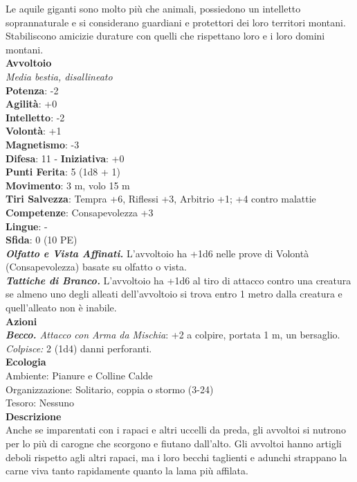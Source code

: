 \begin{multicols}{2}
Le aquile giganti sono molto più che animali, possiedono un intelletto soprannaturale e si considerano guardiani e protettori dei loro territori montani.\\

Stabiliscono amicizie durature con quelli che rispettano loro e i loro domini montani.\\

\medskip\textbf{Avvoltoio}\\
\emph{Media bestia, disallineato}\\
\textbf{Potenza}: -2\\
\textbf{Agilità}: +0\\
\textbf{Intelletto}: -2\\
\textbf{Volontà}: +1\\
\textbf{Magnetismo}: -3\\
\textbf{Difesa}: 11 - \textbf{Iniziativa}: +0\\
\textbf{Punti Ferita}: 5 (1d8 + 1)\\
\textbf{Movimento}: 3 m, volo 15 m\\
\textbf{Tiri Salvezza}: Tempra +6, Riflessi +3, Arbitrio +1; +4 contro malattie\\
\textbf{Competenze}: Consapevolezza +3\\
\textbf{Lingue}: -\\
\textbf{Sfida}: 0 (10 PE)\smallskip\\
\emph{\textbf{Olfatto e Vista Affinati.}} L'avvoltoio ha +1d6 nelle prove di Volontà (Consapevolezza) basate su olfatto o vista.\\
\emph{\textbf{Tattiche di Branco.}} L'avvoltoio ha +1d6 al tiro di attacco contro una creatura se almeno uno degli alleati dell'avvoltoio si trova entro 1 metro dalla creatura e quell'alleato non è inabile.\\
\smallskip\textbf{Azioni}\\
\emph{\textbf{Becco.} Attacco con Arma da Mischia}: +2 a colpire, portata 1 m, un bersaglio.\\
\emph{Colpisce:} 2 (1d4) danni perforanti.\\
\textbf{Ecologia}\\
Ambiente: Pianure e Colline Calde\\
Organizzazione: Solitario, coppia o stormo (3-24)\\
Tesoro: Nessuno\\
\textbf{Descrizione}\\
Anche se imparentati con i rapaci e altri uccelli da preda, gli avvoltoi si nutrono per lo più di carogne che scorgono e fiutano dall'alto. Gli avvoltoi hanno artigli deboli rispetto agli altri rapaci, ma i loro becchi taglienti e adunchi strappano la carne viva tanto rapidamente quanto la lama più affilata.\\


\end{multicols}
